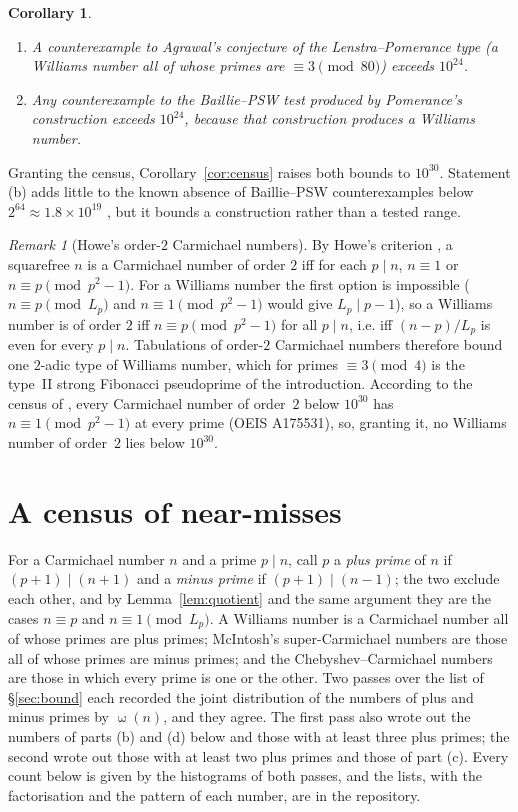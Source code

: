 \documentclass[11pt]{amsart}
\newtheorem{corollary}[theorem]{Corollary}
\theoremstyle{definition}
\theoremstyle{remark}
\newtheorem{remark}[theorem]{Remark}
\DeclareMathOperator{\omg}{\omega}
\begin{document}
\begin{corollary}\label{cor:apps}
\begin{enumerate}[label=\textup{(\alph*)}]
\item A counterexample to Agrawal's conjecture of the Lenstra--Pomerance type (a Williams number all of whose primes are $\equiv3\pmod{80}$) exceeds $10^{24}$.
\item Any counterexample to the Baillie--PSW test produced by Pomerance's construction \cite{Pomerance84} exceeds $10^{24}$, because that construction produces a Williams number.
\end{enumerate}
\end{corollary}
Granting the census, Corollary~\ref{cor:census} raises both bounds to $10^{30}$. Statement (b) adds little to the known absence of Baillie--PSW counterexamples below $2^{64}\approx1.8\times10^{19}$ \cite{BFW21}, but it bounds a construction rather than a tested range.

\begin{remark}[Howe's order-$2$ Carmichael numbers]
By Howe's criterion \cite{Howe00}, a squarefree $n$ is a Carmichael number of order $2$ iff for each $p\mid n$, $n\equiv1$ or $n\equiv p\pmod{p^2-1}$. For a Williams number the first option is impossible ($n\equiv p\pmod{L_p}$ and $n\equiv1\pmod{p^2-1}$ would give $L_p\mid p-1$), so a Williams number is of order $2$ iff $n\equiv p\pmod{p^2-1}$ for all $p\mid n$, i.e. iff $(n-p)/L_p$ is even for every $p\mid n$. Tabulations of order-$2$ Carmichael numbers therefore bound one $2$-adic type of Williams number, which for primes $\equiv3\pmod4$ is the type~II strong Fibonacci pseudoprime of the introduction. According to the census of \cite{Pud30}, every Carmichael number of order~$2$ below $10^{30}$ has $n\equiv1\pmod{p^2-1}$ at every prime (OEIS A175531), so, granting it, no Williams number of order~$2$ lies below $10^{30}$.
\end{remark}

\section{A census of near-misses}\label{sec:near}

For a Carmichael number $n$ and a prime $p\mid n$, call $p$ a \emph{plus prime} of $n$ if $(p+1)\mid(n+1)$ and a \emph{minus prime} if $(p+1)\mid(n-1)$; the two exclude each other, and by Lemma~\ref{lem:quotient} and the same argument they are the cases $n\equiv p$ and $n\equiv1\pmod{L_p}$. A Williams number is a Carmichael number all of whose primes are plus primes; McIntosh's super-Carmichael numbers \cite{McIntosh14} are those all of whose primes are minus primes; and the Chebyshev--Carmichael numbers are those in which every prime is one or the other. Two passes over the list of \S\ref{sec:bound} each recorded the joint distribution of the numbers of plus and minus primes by $\omg(n)$, and they agree. The first pass also wrote out the numbers of parts (b) and (d) below and those with at least three plus primes; the second wrote out those with at least two plus primes and those of part (c). Every count below is given by the histograms of both passes, and the lists, with the factorisation and the pattern of each number, are in the repository.
\end{document}
